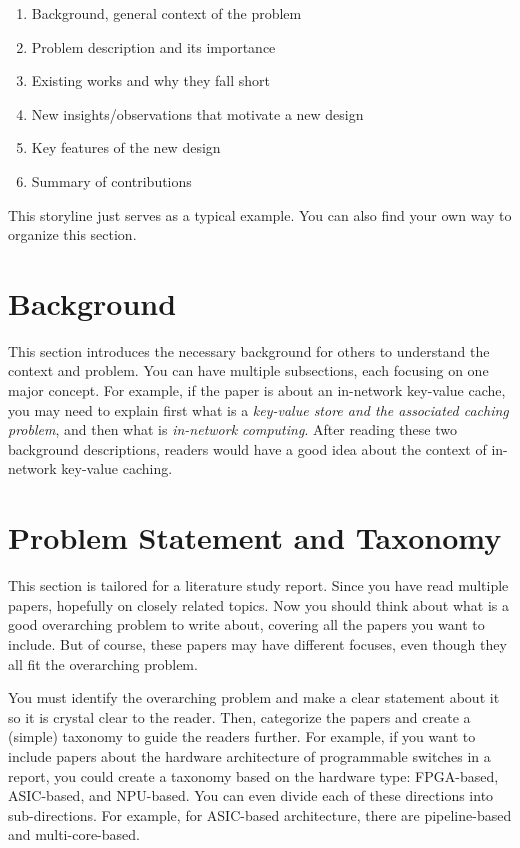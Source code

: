 \documentclass[report]{template-core/upb-cn}
\begin{document}
\begin{enumerate}
    \item Background, general context of the problem
    \item Problem description and its importance
    \item Existing works and why they fall short
    \item New insights/observations that motivate a new design
    \item Key features of the new design
    \item Summary of contributions
\end{enumerate}

This storyline just serves as a typical example. You can also find your own way to organize this section. 



\section{Background}
\label{sec:background}

This section introduces the necessary background for others to understand the context and problem. You can have multiple subsections, each focusing on one major concept. For example, if the paper is about an in-network key-value cache, you may need to explain first what is a \emph{key-value store and the associated caching problem}, and then what is \emph{in-network computing}. After reading these two background descriptions, readers would have a good idea about the context of in-network key-value caching.


\section{Problem Statement and Taxonomy}
\label{sec:problem}

This section is tailored for a literature study report. Since you have read multiple papers, hopefully on closely related topics. Now you should think about what is a good overarching problem to write about, covering all the papers you want to include. But of course, these papers may have different focuses, even though they all fit the overarching problem.

You must identify the overarching problem and make a clear statement about it so it is crystal clear to the reader. Then, categorize the papers and create a (simple) taxonomy to guide the readers further. For example, if you want to include papers about the hardware architecture of programmable switches in a report, you could create a taxonomy based on the hardware type: FPGA-based, ASIC-based, and NPU-based. You can even divide each of these directions into sub-directions. For example, for ASIC-based architecture, there are pipeline-based and multi-core-based.  
\end{document}
